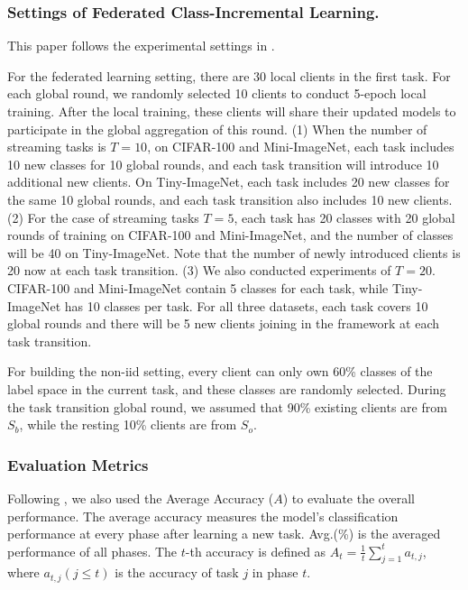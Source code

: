 \documentclass[sigconf,anonymous,review,screen]{acmart}
\begin{document}
\subsubsection{Settings of Federated Class-Incremental Learning.}
This paper follows the experimental settings in \cite{dong2022federated}. 

For the federated learning setting, there are 30 local clients in the first task. For each global round, we randomly selected 10 clients to conduct 5-epoch local training. After the local training, these clients will share their updated models to participate in the global aggregation of this round. (1) When the number of streaming tasks is $T = 10$, on CIFAR-100 and Mini-ImageNet, each task includes 10 new classes for 10 global rounds, and each task transition will introduce 10 additional new clients. On Tiny-ImageNet, each task includes 20 new classes for the same 10 global rounds, and each task transition also includes 10 new clients. (2) For the case of streaming tasks $T = 5$, each task has 20 classes with 20 global rounds of training on CIFAR-100 and Mini-ImageNet, and the number of classes will be 40 on Tiny-ImageNet. Note that the number of newly introduced clients is 20 now at each task transition. (3) We also conducted experiments of $T = 20$. CIFAR-100 and Mini-ImageNet contain 5 classes for each task, while Tiny-ImageNet has 10 classes per task. For all three datasets, each task covers 10 global rounds and there will be 5 new clients joining in the framework at each task transition.

For building the non-iid setting, every client can only own 60\% classes of the label space in the current task, and these classes are randomly selected. During the task transition global round, we assumed that 90\% existing clients are from $S_b$, while the resting 10\% clients are from $S_o$.







\subsubsection{Evaluation Metrics}
Following \cite{dong2022federated}, we also used the Average Accuracy ($A$) to evaluate the overall performance. The average accuracy measures the model's classification performance at every phase after learning a new task. Avg.(\%) is the averaged performance of all phases. The $t$-th accuracy is defined as  $A_t = \frac{1}{t} \sum_{j=1}^t a_{t,j}$,
where $a_{t,j} (j \leq t)$ is the accuracy of task $j$ in phase $t$.
\end{document}
